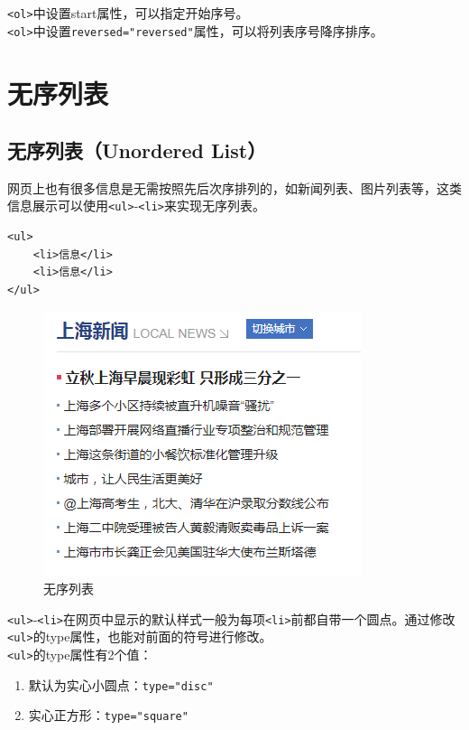 \lstinline|<ol>|中设置start属性，可以指定开始序号。 \\

\lstinline|<ol>|中设置\lstinline|reversed="reversed"|属性，可以将列表序号降序排序。

\newpage

\section{无序列表}

\subsection{无序列表（Unordered List）}

网页上也有很多信息是无需按照先后次序排列的，如新闻列表、图片列表等，这类信息展示可以使用\lstinline|<ul>|-\lstinline|<li>|来实现无序列表。

\begin{lstlisting}[style=htmlcssjs]
<ul>
    <li>信息</li>
    <li>信息</li>
</ul>
\end{lstlisting}

\begin{figure}[H]
    \centering
    \includegraphics[scale=0.8]{img/C3/3-2/1.png}
    \caption{无序列表}
\end{figure}

\lstinline|<ul>|-\lstinline|<li>|在网页中显示的默认样式一般为每项\lstinline|<li>|前都自带一个圆点。通过修改\lstinline|<ul>|的type属性，也能对前面的符号进行修改。 \\

\lstinline|<ul>|的type属性有2个值：

\begin{enumerate}
    \item 默认为实心小圆点：\lstinline|type="disc"|
    \item 实心正方形：\lstinline|type="square"|
\end{enumerate}

